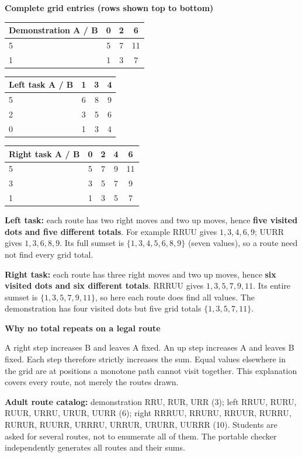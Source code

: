 \documentclass[11pt]{article}
\newcommand{\sub}[1]{\textbf{#1}\par}
\newcommand{\sset}[1]{\{#1\}}
\newcommand{\smalltable}{\small\renewcommand{\arraystretch}{1.2}}
\begin{document}
\sub{Complete grid entries (rows shown top to bottom)}
\begin{center}\smalltable
\begin{tabular}{@{}lccc@{}}\toprule
Demonstration A / B & 0 & 2 & 6\\\midrule
5 & 5 & 7 & 11\\1 & 1 & 3 & 7\\\bottomrule
\end{tabular}\hspace{8mm}
\begin{tabular}{@{}lccc@{}}\toprule
Left task A / B & 1 & 3 & 4\\\midrule
5 & 6 & 8 & 9\\2 & 3 & 5 & 6\\0 & 1 & 3 & 4\\\bottomrule
\end{tabular}

\vspace{6pt}
\begin{tabular}{@{}lcccc@{}}\toprule
Right task A / B & 0 & 2 & 4 & 6\\\midrule
5 & 5 & 7 & 9 & 11\\3 & 3 & 5 & 7 & 9\\1 & 1 & 3 & 5 & 7\\\bottomrule
\end{tabular}\end{center}

\textbf{Left task:} each route has two right moves and two up moves, hence \textbf{five visited dots and five different totals}. For example RRUU gives $1,3,4,6,9$; UURR gives $1,3,6,8,9$. Its full sumset is $\sset{1,3,4,5,6,8,9}$ (seven values), so a route need not find every grid total.

\textbf{Right task:} each route has three right moves and two up moves, hence \textbf{six visited dots and six different totals}. RRRUU gives $1,3,5,7,9,11$. Its entire sumset is $\sset{1,3,5,7,9,11}$, so here each route does find all values. The demonstration has four visited dots but five grid totals $\sset{1,3,5,7,11}$.

\sub{Why no total repeats on a legal route}
A right step increases B and leaves A fixed. An up step increases A and leaves B fixed. Each step therefore strictly increases the sum. Equal values elsewhere in the grid are at positions a monotone path cannot visit together. This explanation covers every route, not merely the routes drawn.

\textbf{Adult route catalog:} demonstration RRU, RUR, URR (3); left RRUU, RURU, RUUR, URRU, URUR, UURR (6); right RRRUU, RRURU, RRUUR, RURRU, RURUR, RUURR, URRRU, URRUR, URURR, UURRR (10). Students are asked for several routes, not to enumerate all of them. The portable checker independently generates all routes and their sums.
\end{document}
